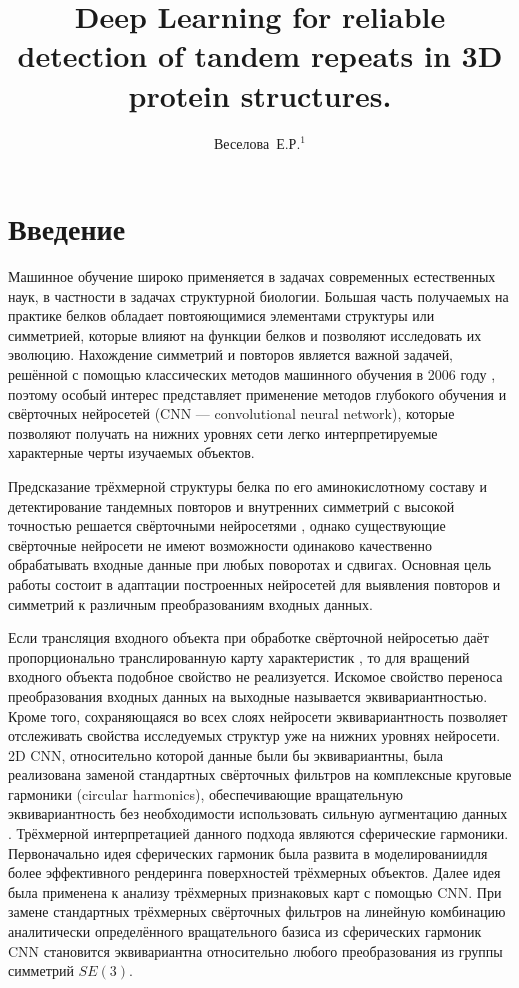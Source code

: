 \documentclass[12pt,twosides]{article}
\title
[Detection of tandem repeats in proteins]
{Deep Learning for reliable detection of tandem repeats in 3D protein structures.}
\author
[Веселова~Е.Р.] 
{Веселова~Е.Р.$^1$}
\begin{document}
	\maketitle
	
	\section{Введение}
	Машинное обучение широко применяется в задачах современных естественных наук, в частности в задачах структурной биологии. Большая часть получаемых на практике белков обладает повтояющимися элементами структуры или симметрией, которые влияют на функции белков и позволяют исследовать их эволюцию. Нахождение симметрий и повторов является важной задачей, решённой с помощью классических методов машинного обучения в 2006 году \cite{MitGuiPau06}, поэтому особый интерес представляет применение методов глубокого обучения и свёрточных нейросетей (CNN --- convolutional neural network), которые позволяют получать на нижних уровнях сети легко интерпретируемые характерные черты изучаемых объектов. 
	
	Предсказание трёхмерной структуры белка по его аминокислотному составу \cite{BioCNN18} и детектирование тандемных повторов и внутренних симметрий с высокой точностью решается свёрточными нейросетями \cite{DeepSymmetry18}, однако существующие свёрточные нейросети не имеют возможности одинаково качественно обрабатывать входные данные при любых поворотах и сдвигах. Основная цель работы состоит в адаптации построенных нейросетей для выявления повторов и симметрий к различным преобразованиям входных данных. 
	
	Если трансляция входного объекта при обработке свёрточной нейросетью даёт пропорционально транслированную карту характеристик \cite{Lenc18}, то для вращений входного объекта подобное свойство не реализуется. Искомое свойство переноса преобразования входных данных на выходные называется эквивариантностью. Кроме того, сохраняющаяся во всех слоях нейросети эквивариантность позволяет отслеживать свойства исследуемых структур уже на нижних уровнях нейросети. 2D CNN, относительно которой данные были бы эквивариантны, была реализована заменой стандартных свёрточных фильтров на комплексные круговые гармоники (circular harmonics), обеспечивающие вращательную эквивариантность без необходимости использовать сильную аугментацию данных \cite{conf/cvpr/WorrallGTB17}. Трёхмерной интерпретацией данного подхода являются сферические гармоники. Первоначально идея сферических гармоник была развита в моделированиидля более эффективного рендеринга поверхностей трёхмерных объектов\cite{journals/cagd/MousaCAG08}. Далее идея была применена к анализу трёхмерных признаковых карт с помощью CNN. При замене стандартных трёхмерных свёрточных фильтров на линейную комбинацию аналитически определённого вращательного базиса из сферических гармоник CNN становится эквивариантна относительно любого преобразования из группы симметрий $SE(3)$\cite{DBLP:journals/corr/abs-1807-02547}.
	
\end{document}

